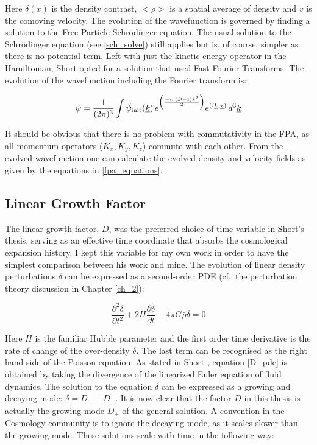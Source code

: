 \noindent Here $\delta(x)$ is the density contrast, $<\rho>$ is a spatial average of density and $v$ is the comoving velocity. The evolution of the wavefunction is governed by finding a solution to the Free Particle Schr\"odinger equation. The usual solution to the Schr\"odinger equation (see \ref{sch_solve}) still applies but is, of course, simpler as there is no potential term. Left with just the kinetic energy operator in the Hamiltonian, Short opted for a solution that used Fast Fourier Transforms. The evolution of the wavefunction including the Fourier transform is:

\begin{equation}
\label{fpa_evolve}
\psi = \frac{1}{(2\pi)^3} \int \hat{\psi}_{\rm init}(\underline{k})\, e^{ \left(\frac{-i\nu(D-1)k^2}{2}\right)} e^{(i\underline{k}.\underline{x})}\,d^3\underline{k}
\end{equation}

\noindent It should be obvious that there is no problem with commutativity in the FPA, as all momentum operators ($K_x, K_y, K_z$) commute with each other. From the evolved wavefunction one can calculate the evolved density and velocity fields as given by the equations in \ref{fpa_equations}.

\subsection{Linear Growth Factor}
\label{lingrow}
The linear growth factor, $D$, was the preferred choice of time variable in Short's thesis, serving as an effective time coordinate that absorbs the cosmological expansion history. I kept this variable for my own work in order to have the simplest comparison between his work and mine. The evolution of linear density perturbations $\delta$ can be expressed as a second-order PDE (cf.\ the perturbation theory discussion in Chapter \ref{ch_2}):

\begin{equation}
\label{D_pde}
\frac{\partial^2\delta}{\partial t^2} + 2H\frac{\partial\delta}{\partial t} - 4\pi G\bar{\rho}\delta = 0
\end{equation}

\noindent Here $H$ is the familiar Hubble parameter and the first order time derivative is the rate of change of the over-density $\delta$. The last term can be recognised as the right hand side of the Poisson equation. As stated in Short \citep{bib_short}, equation \ref{D_pde} is obtained by taking the divergence of the linearized Euler equation of fluid dynamics. The solution to the equation $\delta$ can be expressed as a growing and decaying mode: $\delta = D_+ + D_-$. It is now clear that the factor $D$ in this thesis is actually the growing mode $D_+$ of the general solution. A convention in the Cosmology community is to ignore the decaying mode, as it scales slower than the growing mode. These solutions scale with time in the following way:

